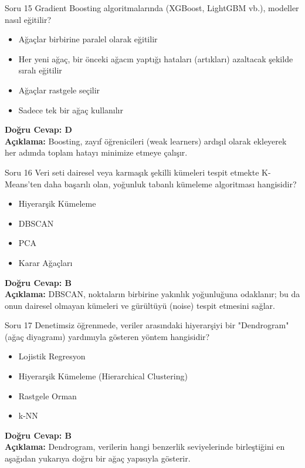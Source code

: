 \documentclass[12pt,a4paper]{article}
\begin{document}
\begin{testcard}{Soru 15}
    Gradient Boosting algoritmalarında (XGBoost, LightGBM vb.), modeller nasıl eğitilir?
    \begin{itemize}
        \item[A)] Ağaçlar birbirine paralel olarak eğitilir
        \item[B)] Her yeni ağaç, bir önceki ağacın yaptığı hataları (artıkları) azaltacak şekilde sıralı eğitilir
        \item[C)] Ağaçlar rastgele seçilir
        \item[D)] Sadece tek bir ağaç kullanılır
    \end{itemize}
    \tcblower
    \textbf{Doğru Cevap: D} \\
    \textbf{Açıklama:} Boosting, zayıf öğrenicileri (weak learners) ardışıl olarak ekleyerek her adımda toplam hatayı minimize etmeye çalışır.
\end{testcard}

\begin{testcard}{Soru 16}
    Veri seti dairesel veya karmaşık şekilli kümeleri tespit etmekte K-Means'ten daha başarılı olan, yoğunluk tabanlı kümeleme algoritması hangisidir?
    \begin{itemize}
        \item[A)] Hiyerarşik Kümeleme
        \item[B)] DBSCAN
        \item[C)] PCA
        \item[D)] Karar Ağaçları
    \end{itemize}
    \tcblower
    \textbf{Doğru Cevap: B} \\
    \textbf{Açıklama:} DBSCAN, noktaların birbirine yakınlık yoğunluğuna odaklanır; bu da onun dairesel olmayan kümeleri ve gürültüyü (noise) tespit etmesini sağlar.
\end{testcard}

\begin{testcard}{Soru 17}
    Denetimsiz öğrenmede, veriler arasındaki hiyerarşiyi bir "Dendrogram" (ağaç diyagramı) yardımıyla gösteren yöntem hangisidir?
    \begin{itemize}
        \item[A)] Lojistik Regresyon
        \item[B)] Hiyerarşik Kümeleme (Hierarchical Clustering)
        \item[C)] Rastgele Orman
        \item[D)] k-NN
    \end{itemize}
    \tcblower
    \textbf{Doğru Cevap: B} \\
    \textbf{Açıklama:} Dendrogram, verilerin hangi benzerlik seviyelerinde birleştiğini en aşağıdan yukarıya doğru bir ağaç yapısıyla gösterir.
\end{testcard}
\end{document}
